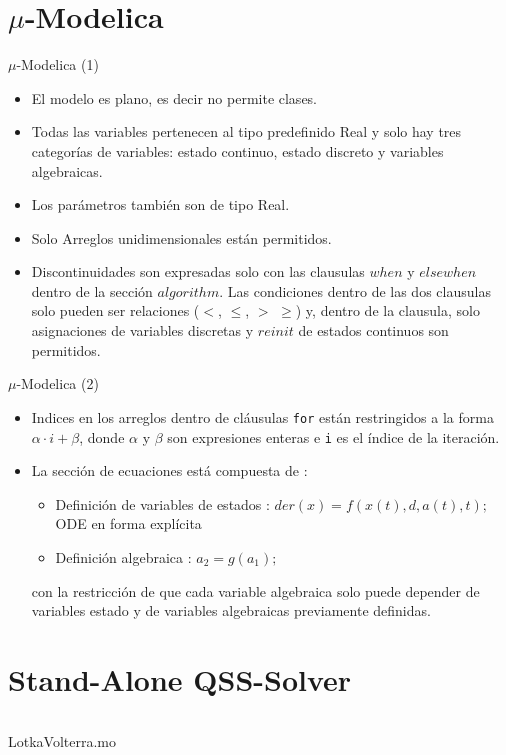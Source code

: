 \documentclass{beamer}
\begin{document}
\section{$\mu$-Modelica}
\begin{frame}{$\mu$-Modelica (1)}
	\begin{itemize}
	 \item<1-> El modelo es plano, es decir no permite clases.
	 \item<2-> Todas las variables pertenecen al tipo predefinido Real y solo hay tres categorías de variables: estado continuo, estado discreto y variables 
	algebraicas.
	 \item<3-> Los parámetros también son de tipo Real. 
	 \item<4-> Solo Arreglos unidimensionales están permitidos. 
	 \item<5-> Discontinuidades son expresadas solo con las clausulas $when$ y $elsewhen$ dentro de la sección $algorithm$. Las condiciones dentro de las dos 
	clausulas solo pueden ser relaciones ($<$, $\leqslant$, $>$ $\geqslant$) y, dentro de la clausula, solo asignaciones de variables discretas y $reinit$ 
	de estados continuos son permitidos.
	\end{itemize}
\end{frame}

\begin{frame}{$\mu$-Modelica (2)}
\begin{itemize}
	\item<1-> Indices en los arreglos dentro de cláusulas \texttt{for} están restringidos a la forma $\alpha \cdot i + \beta$, donde $\alpha$ y $\beta$ son expresiones enteras e \texttt{i} es el índice de la iteración.
	 \item<2-> La sección de ecuaciones está compuesta de :
	 \begin{itemize}
		\item Definición de variables de estados : $der(x) =  f (x(t), d, a(t), t);$ ODE en forma explícita
		\item Definición algebraica : $a_2  = g(a_1);$
	 \end{itemize}
	 con la restricción de que cada variable algebraica solo puede depender de variables estado y de variables algebraicas previamente definidas.
\end{itemize}
\end{frame}


\section{Stand-Alone QSS-Solver}
\begin{frame}
	\begin{listing}[H]    
		\inputminted[linenos]{modelica}{src/lotka_volterra_qss.mo}
		\caption{LotkaVolterra.mo}\label{lst:LotkaVolterra_qss.mo}
	\end{listing} 
\end{frame}
\end{document}
